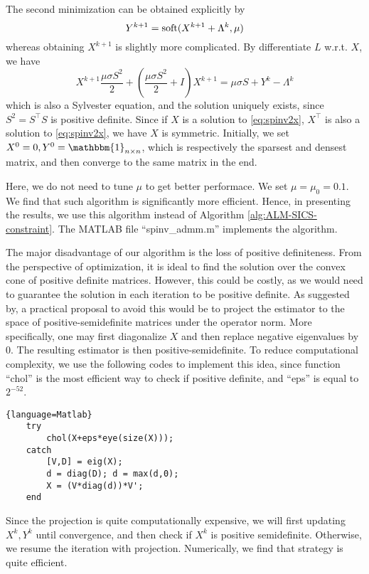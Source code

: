 \documentclass[conference,onecolumn,12pt]{IEEEtran}
\newcommand{\<}{\langle}
\renewcommand{\>}{\rangle}
\numberwithin{equation}{section}
\begin{document}
The second minimization can be obtained explicitly by
\begin{equation*}
    Y^{k+1}={\rm soft}(X^{k+1}+\Lambda^k,\mu)
\end{equation*}
whereas obtaining $X^{k+1}$ is slightly more complicated. By differentiate $L$ w.r.t. $X$, we have
\begin{equation}
    \label{eq:spinv2x}
    X^{k+1} \frac{\mu\sigma S^2}{2}+(\frac{\mu\sigma S^2}{2}+I)X^{k+1}=\mu\sigma S+Y^k-\Lambda^k
\end{equation}
which is also a Sylvester equation, and the solution uniquely exists, since $S^2=S^\top S$ is positive definite. Since if $X$ is a solution to \ref{eq:spinv2x}, $X^\top$ is also a solution to \ref{eq:spinv2x}, we have $X$ is symmetric. Initially, we set $X^0=0,Y^0=\mathbbm{1}_{n\times n}$, which is respectively the sparsest and densest matrix, and then converge to the same matrix in the end.

Here, we do not need to tune $\mu$ to get better performace. We set $\mu=\mu_0=0.1$. We find that such algorithm is significantly more efficient. Hence, in presenting the results, we use this algorithm instead of Algorithm \ref{alg:ALM-SICS-constraint}. The MATLAB file ``spinv\_admm.m'' implements the algorithm. 

The major disadvantage of our algorithm is the loss of positive definiteness. From the perspective of optimization, it is ideal to find the solution over the convex cone of positive definite matrices.
However, this could be costly, as we would need to guarantee the solution in each iteration to be positive definite. As suggested by\cite{cai2010optimal}, a practical proposal to avoid this would be to project the estimator to the space of positive-semidefinite matrices under the operator norm. More specifically, one may first diagonalize $X$ and then replace negative eigenvalues by 0. The resulting estimator is then positive-semidefinite. To reduce computational complexity, we use the following codes to implement this idea, since function ``chol'' is the most efficient way to check if positive definite, and ``eps'' is equal to $2^{-52}$.
\begin{lstlisting}{language=Matlab}
    try
        chol(X+eps*eye(size(X)));
    catch
        [V,D] = eig(X);
        d = diag(D); d = max(d,0);
        X = (V*diag(d))*V';
    end
\end{lstlisting}

Since the projection is quite computationally expensive, we will first updating $X^k,Y^k$ until convergence, and then check if $X^k$ is positive semidefinite. Otherwise, we resume the iteration with projection. Numerically, we find that strategy is quite efficient. 
\end{document}
